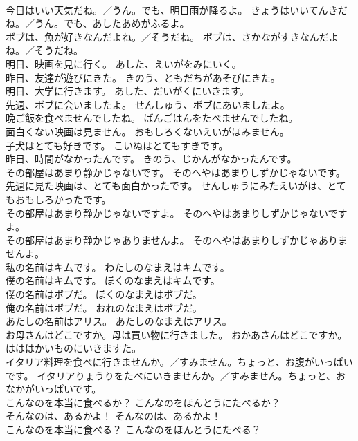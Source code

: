 \documentclass[8pt]{extreport}
\begin{document}
\begin{CJK}{UTF8}{min}
\\	今日はいい天気だね。／うん。でも、明日雨が降るよ。	きょうはいいてんきだね。／うん。でも、あしたあめがふるよ。 
\\	ボブは、魚が好きなんだよね。／そうだね。	ボブは、さかながすきなんだよね。／そうだね。 
\\	明日、映画を見に行く。	あした、えいがをみにいく。 
\\	昨日、友達が遊びにきた。	きのう、ともだちがあそびにきた。 
\\	明日、大学に行きます。	あした、だいがくにいきます。 
\\	先週、ボブに会いましたよ。	せんしゅう、ボブにあいましたよ。 
\\	晩ご飯を食べませんでしたね。	ばんごはんをたべませんでしたね。 
\\	面白くない映画は見ません。	おもしろくないえいがほみません。 
\\	子犬はとても好きです。	こいぬはとてもすきです。 
\\	昨日、時間がなかったんです。	きのう、じかんがなかったんです。 
\\	その部屋はあまり静かじゃないです。	そのへやはあまりしずかじゃないです。 
\\	先週に見た映画は、とても面白かったです。	せんしゅうにみたえいがは、とてもおもしろかったです。 
\\	その部屋はあまり静かじゃないですよ。	そのへやはあまりしずかじゃないですよ。 
\\	その部屋はあまり静かじゃありませんよ。	そのへやはあまりしずかじゃありませんよ。 
\\	私の名前はキムです。	わたしのなまえはキムです。 
\\	僕の名前はキムです。	ぼくのなまえはキムです。 
\\	僕の名前はボブだ。	ぼくのなまえはボブだ。 
\\	俺の名前はボブだ。	おれのなまえはボブだ。 
\\	あたしの名前はアリス。	あたしのなまえはアリス。 
\\	お母さんはどこですか。母は買い物に行きました。	おかあさんはどこですか。はははかいものにいきますた。 
\\	イタリア料理を食べに行きませんか。／すみません。ちょっと、お腹がいっぱいです。	イタリアりょうりをたべにいきませんか。／すみません。ちょっと、おなかがいっぱいです。 
\\	こんなのを本当に食べるか？	こんなのをほんとうにたべるか？ 
\\	そんなのは、あるかよ！	そんなのは、あるかよ！ 
\\	こんなのを本当に食べる？	こんなのをほんとうにたべる？ 

\end{CJK}
\end{document}
